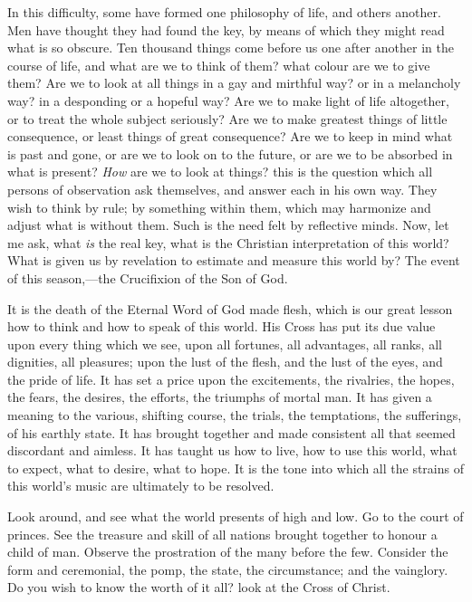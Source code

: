 In this difficulty, some have formed one philosophy of
life, and others another. Men have thought they had found
the key, by means of which they might read what is so
obscure. Ten thousand things come before us one after
another in the course of life, and what are we to think
of them? what colour are we to give them? Are we to look
at all things in a gay and mirthful way? or in a
melancholy way? in a desponding or a hopeful way? Are we
to make light of life altogether, or to treat the whole
subject seriously? Are we to make greatest things of
little consequence, or least things of great consequence?
Are we to keep in mind what is past and gone, or are we to look on to the future, or are we to be absorbed in what
is present? \emph{How} are we to look at things? this is the
question which all persons of observation ask themselves,
and answer each in his own way. They wish to think by
rule; by something within them, which may harmonize and
adjust what is without them. Such is the need felt by
reflective minds. Now, let me ask, what \emph{is} the real key,
what is the Christian interpretation of this world? What
is given us by revelation to estimate and measure this
world by? The event of this season,—the Crucifixion
of the Son of God.

It is the death of the Eternal Word of God made flesh,
which is our great lesson how to think and how to speak
of this world. His Cross has put its due value upon every thing which we see, upon all fortunes, all
advantages, all ranks, all dignities, all pleasures; upon
the lust of the flesh, and the lust of the eyes, and the
pride of life. It has set a price upon the excitements,
the rivalries, the hopes, the fears, the desires, the
efforts, the triumphs of mortal man. It has given a
meaning to the various, shifting course, the trials, the
temptations, the sufferings, of his earthly state. It has
brought together and made consistent all that seemed
discordant and aimless. It has taught us how to live, how
to use this world, what to expect, what to desire, what
to hope. It is the tone into which all the strains of
this world's music are ultimately to be resolved.

Look around, and see what the world presents of high
and low. Go to the court of princes. See the treasure and
skill of all nations brought together to honour a child
of man. Observe the prostration of the many before the
few. Consider the form and ceremonial, the pomp, the
state, the circumstance; and the vainglory. Do you wish
to know the worth of it all? look at the Cross of Christ.

